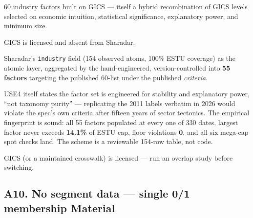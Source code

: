 \documentclass[11pt,a4paper]{article}
\newcommand{\WARN}[1]{\textcolor{warn}{\textbf{#1}}}
\begin{document}
\begin{description}[style=nextline]
  \item[USE4] 60 industry factors built on GICS --- itself a hybrid recombination
    of GICS levels selected on economic intuition, statistical significance,
    explanatory power, and minimum size.
  \item[Deviation] GICS is licensed and absent from Sharadar.
  \item[Solution] Sharadar's \texttt{industry} field (154 observed atoms, 100\%
    ESTU coverage) as the atomic layer, aggregated by the hand-engineered,
    version-controlled  into \textbf{55 factors}
    targeting the published 60-list under the published \emph{criteria}.
  \item[Validity] USE4 itself states the factor set is engineered for stability
    and explanatory power, ``not taxonomy purity'' --- replicating the 2011
    labels verbatim in 2026 would violate the spec's own criteria after fifteen
    years of sector tectonics. The empirical fingerprint is sound: all 55
    factors populated at every one of 330 dates, largest factor never exceeds
    \textbf{14.1\%} of ESTU cap, floor violations \textbf{0}, and all six
    mega-cap spot checks land. The scheme is a reviewable 154-row table, not
    code.
  \item[Revisit when] GICS (or a maintained crosswalk) is licensed --- run an
    overlap study before switching.
\end{description}

\subsection{A10. No segment data --- single 0/1 membership \hfill \WARN{Material}}
\end{document}
